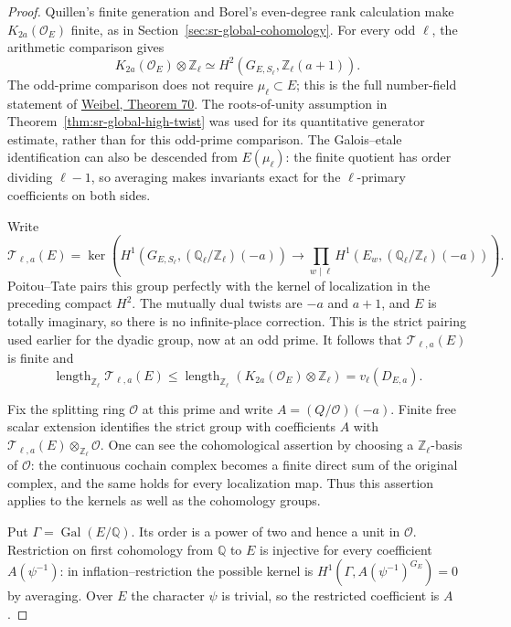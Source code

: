\begin{proof}
Quillen's finite generation and Borel's even-degree rank calculation
make \(K_{2a}(\mathcal O_E)\) finite, as in
Section~\ref{sec:sr-global-cohomology}.
For every odd \(\ell\), the arithmetic comparison gives
\[
 K_{2a}(\mathcal O_E)\otimes\mathbb Z_\ell
     \simeq H^2(G_{E,S_\ell},\mathbb Z_\ell(a+1)).
\]
The odd-prime comparison does not require
\(\mu_\ell\subset E\); this is the full number-field statement of
\href{https://www.sas.rochester.edu/mth/sites/doug-ravenel/otherpapers/weibel-ints.pdf}{Weibel, Theorem 70}.
The roots-of-unity assumption in
Theorem~\ref{thm:sr-global-high-twist} was used for its quantitative
generator estimate, rather than for this odd-prime comparison.
The Galois--etale identification can also be descended from
\(E(\mu_\ell)\): the finite quotient has order dividing
\(\ell-1\), so averaging makes invariants exact for the
\(\ell\)-primary coefficients on both sides.

Write
\[
 \mathcal T_{\ell,a}(E)
    =\ker\left(H^1(G_{E,S_\ell},
                     (\mathbb Q_\ell/\mathbb Z_\ell)(-a))
           \longrightarrow
              \prod_{w\mid\ell}H^1(E_w,
                     (\mathbb Q_\ell/\mathbb Z_\ell)(-a))\right).
\]
Poitou--Tate pairs this group perfectly with the kernel of
localization in the preceding compact \(H^2\).
The mutually dual twists are \(-a\) and \(a+1\), and \(E\)
is totally imaginary, so there is no infinite-place correction.
This is the strict pairing used earlier for the dyadic group,
now at an odd prime.
It follows that \(\mathcal T_{\ell,a}(E)\) is finite and
\begin{equation}\label{eq:sr-strict-K-order}
 \operatorname{length}_{\mathbb Z_\ell}\mathcal T_{\ell,a}(E)
        \leq\operatorname{length}_{\mathbb Z_\ell}
                    (K_{2a}(\mathcal O_E)\otimes\mathbb Z_\ell)
        =v_\ell(D_{E,a}).
\end{equation}

Fix the splitting ring \(\mathcal O\) at this prime and write
\(A=(Q/\mathcal O)(-a)\).
Finite free scalar extension identifies the strict group with
coefficients \(A\) with
\(\mathcal T_{\ell,a}(E)\otimes_{\mathbb Z_\ell}\mathcal O\).
One can see the cohomological assertion by choosing a
\(\mathbb Z_\ell\)-basis of \(\mathcal O\): the continuous cochain
complex becomes a finite direct sum of the original complex,
and the same holds for every localization map.
Thus this assertion applies to the kernels as well as the
cohomology groups.

Put \(\Gamma=\operatorname{Gal}(E/\mathbb Q)\).
Its order is a power of two and hence a unit in \(\mathcal O\).
Restriction on first cohomology from \(\mathbb Q\) to \(E\)
is injective for every coefficient
\(A(\psi^{-1})\): in inflation--restriction the possible kernel
is \(H^1(\Gamma,A(\psi^{-1})^{G_E})=0\) by averaging.
Over \(E\) the character \(\psi\) is trivial, so the restricted
coefficient is \(A\).


\end{proof}
